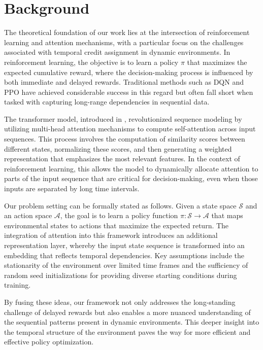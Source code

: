 \documentclass{article}
\begin{document}
\section{Background}
The theoretical foundation of our work lies at the intersection of reinforcement learning and attention mechanisms, with a particular focus on the challenges associated with temporal credit assignment in dynamic environments. In reinforcement learning, the objective is to learn a policy $\pi$ that maximizes the expected cumulative reward, where the decision-making process is influenced by both immediate and delayed rewards. Traditional methods such as DQN  and PPO  have achieved considerable success in this regard but often fall short when tasked with capturing long-range dependencies in sequential data.

The transformer model, introduced in \cite{ashish_2017_attention}, revolutionized sequence modeling by utilizing multi-head attention mechanisms to compute self-attention across input sequences. This process involves the computation of similarity scores between different states, normalizing these scores, and then generating a weighted representation that emphasizes the most relevant features. In the context of reinforcement learning, this allows the model to dynamically allocate attention to parts of the input sequence that are critical for decision-making, even when those inputs are separated by long time intervals.

Our problem setting can be formally stated as follows. Given a state space $\mathcal{S}$ and an action space $\mathcal{A}$, the goal is to learn a policy function $\pi:\mathcal{S}\rightarrow\mathcal{A}$ that maps environmental states to actions that maximize the expected return. The integration of attention into this framework introduces an additional representation layer, whereby the input state sequence is transformed into an embedding that reflects temporal dependencies. Key assumptions include the stationarity of the environment over limited time frames and the sufficiency of random seed initializations for providing diverse starting conditions during training.

By fusing these ideas, our framework not only addresses the long-standing challenge of delayed rewards but also enables a more nuanced understanding of the sequential patterns present in dynamic environments. This deeper insight into the temporal structure of the environment paves the way for more efficient and effective policy optimization.
\end{document}
